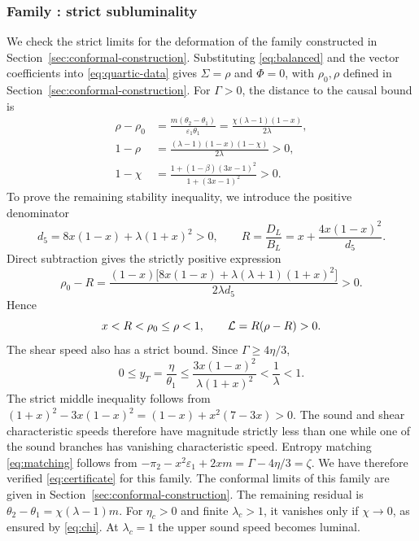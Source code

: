 \subsubsection*{Family : strict subluminality}
\label{app:sec:charged-strict-conformal}
We check the strict limits for the deformation of the  family
constructed in Section~\ref{sec:conformal-construction}. Substituting \eqref{eq:balanced} and the  vector coefficients
into \eqref{eq:quartic-data} gives $\Sigma=\rho$ and $\Phi=0$, with
$\rho_0,\rho$ defined in Section~\ref{sec:conformal-construction}.
For $\Gamma>0$, the distance to the causal bound is
\begin{align}\label{app:eq:charged-AS-sound-margin}
 \rho-\rho_0&=\frac{m(\theta_2-\theta_1)}{\varepsilon_1\theta_1}
 =\frac{\chi(\lambda-1)(1-x)}{2\lambda},\nonumber\\
 1-\rho&=\frac{(\lambda-1)(1-x)(1-\chi)}{2\lambda}>0,\\
 1-\chi&=\frac{1+(1-\beta)(3x-1)^2}{1+(3x-1)^2}>0.\nonumber
\end{align}
To prove the remaining stability inequality, we introduce the positive denominator
\begin{equation}
 d_5=8x(1-x)+\lambda(1+x)^2>0,\qquad
 R=\frac{D_L}{B_L}=x+\frac{4x(1-x)^2}{d_5}.
\end{equation}
Direct subtraction gives the strictly positive expression
\begin{equation}\label{app:eq:charged-AS-R-margin}
 \rho_0-R=
 \frac{(1-x)\big[8x(1-x)+\lambda(\lambda+1)(1+x)^2\big]}
      {2\lambda d_5}>0.
\end{equation}
Hence
\begin{equation}\label{app:eq:charged-AS-strict-interval}
 x<R<\rho_0\leq\rho<1,\qquad
 \mathcal L=R(\rho-R)>0.
\end{equation}
The shear speed also has a strict bound. Since $\Gamma\geq4\eta/3$,
\begin{equation}\label{app:eq:charged-AS-shear-margin}
 0\leq y_T=\frac{\eta}{\theta_1}
 \leq\frac{3x(1-x)^2}{\lambda(1+x)^2}<\frac1\lambda<1.
\end{equation}
The strict middle inequality follows from
$(1+x)^2-3x(1-x)^2=(1-x)+x^2(7-3x)>0$.
The sound and shear characteristic speeds therefore have magnitude
strictly less than one while one of the sound branches has vanishing characteristic speed.
Entropy matching \eqref{eq:matching} follows from
$-\pi_2-x^2\varepsilon_1+2xm=\Gamma-4\eta/3=\zeta$. We have therefore verified \eqref{eq:certificate} for this family. The conformal limits of this family are given in Section~\ref{sec:conformal-construction}.
The remaining residual is $\theta_2-\theta_1=\chi(\lambda-1)m$.
For $\eta_c>0$ and finite $\lambda_c>1$, it vanishes only if
$\chi\to0$, as ensured by \eqref{eq:chi}. At $\lambda_c=1$ the upper
sound speed becomes luminal.

